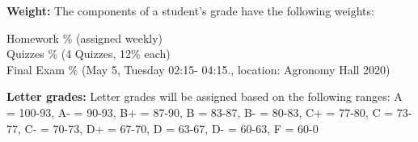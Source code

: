 \documentclass[12pt]{article}\usepackage[]{graphicx}\usepackage[]{color}
\begin{document}
\begin{center} 
	\begin{minipage}{6.5in}
		\begin{flushleft}
			\textbf{Weight:} The components of a student's grade have the following weights:\\
			\begin{center} 
				\begin{minipage}{6in}
					\begin{flushleft}
						Homework \%  (assigned weekly) \\
						Quizzes \%  (4 Quizzes, 12\% each) \\
						Final Exam \% (May 5, Tuesday 02:15- 04:15., location:  Agronomy Hall 2020) \\
					\end{flushleft}
				\end{minipage}
			\end{center}
		\end{flushleft}
	\end{minipage}
\end{center}

\begin{center} 
	\begin{minipage}{6.5in}
		\begin{flushleft}
			\textbf{Letter grades:} 
			Letter grades will be assigned based on the following ranges: A = 100-93, A- = 90-93, B+ = 87-90, B = 83-87, B- = 80-83, C+ = 77-80, C = 73-77, C- = 70-73, D+ = 67-70, D = 63-67, D- = 60-63, F = 60-0
		\end{flushleft}
	\end{minipage}
\end{center}
\end{document}
